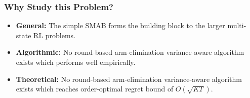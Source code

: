 \begin{frame}
\frametitle{Why Study this Problem?}
\begin{itemize}
\item<1-> \textbf{General:} The simple SMAB forms the building block to the larger multi-state RL problems.
\item<2-> \textbf{Algorithmic:} No round-based arm-elimination variance-aware algorithm exists which performs well empirically.
\item<3-> \textbf{Theoretical:} No round-based arm-elimination variance-aware algorithm exists which reaches order-optimal regret bound of $O\left(\sqrt{KT} \right)$.
\end{itemize}
\end{frame}

